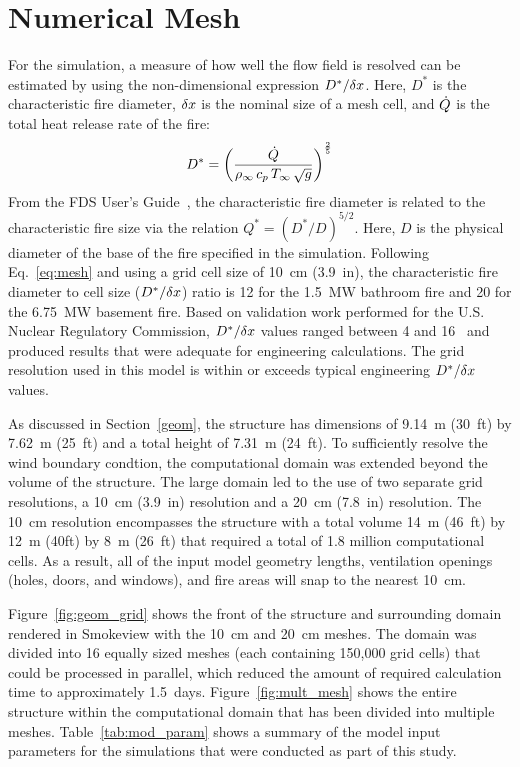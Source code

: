 \documentclass[12pt,oneside]{book}
\begin{document}
\section{Numerical Mesh}
\label{mesh}
For the simulation, a measure of how well the flow field is resolved can be estimated by using the non-dimensional expression $D^*/\delta x$. Here, $D^*$ is the characteristic fire diameter, $\delta x$ is the nominal size of a mesh cell, and $\dot{Q}$ is the total heat release rate of the fire:
\begin{equation}
D^* = \left(
     \frac{\dot{Q}}{\rho_\infty \, c_p \, T_\infty \, \sqrt{g}}
     \right)^\frac{2}{5} 
\label{eq:mesh}
\end{equation}   
From the FDS User's Guide~\cite{FDS_Users_Guide}, the characteristic fire diameter is related to the characteristic fire size via the
relation $Q^* = (D^*/D)^{5/2}$. Here, $D$ is the physical diameter of the base of the fire specified in the simulation. Following Eq.~\ref{eq:mesh} and using a grid cell size of 10~cm (3.9~in), the characteristic fire diameter to cell size ($D^*/\delta x$) ratio is 12 for the 1.5~MW bathroom fire and 20 for the 6.75~MW basement fire. Based on validation work performed for the U.S. Nuclear Regulatory Commission, $D^*/\delta x$ values ranged between 4 and 16~\cite{NUREG_1824} and produced results that were adequate for engineering calculations. The grid resolution used in this model is within or exceeds typical engineering $D^*/\delta x$ values.

As discussed in Section~\ref{geom}, the structure has dimensions of 9.14~m (30~ft) by 7.62~m (25~ft) and a total height of 7.31~m (24~ft). To sufficiently resolve the wind boundary condtion, the computational domain was extended beyond the volume of the structure. The large domain led to the use of two separate grid resolutions, a 10~cm (3.9~in) resolution and a 20~cm (7.8~in) resolution. The 10~cm resolution encompasses the structure with a total volume 14~m (46~ft) by 12~m (40ft) by 8~m (26~ft) that required a total of 1.8 million computational cells. As a result, all of the input model geometry lengths, ventilation openings (holes, doors, and windows), and fire areas will snap to the nearest 10~cm.

Figure~\ref{fig:geom_grid} shows the front of the structure and surrounding domain rendered in Smokeview with the 10~cm  and 20~cm meshes. The domain was divided into 16 equally sized meshes (each containing 150,000 grid cells) that could be processed in parallel, which reduced the amount of required calculation time to approximately 1.5~days. Figure~\ref{fig:mult_mesh} shows the entire structure within the computational domain that has been divided into multiple meshes. Table~\ref{tab:mod_param} shows a summary of the model input parameters for the simulations that were conducted as part of this study.
\end{document}
